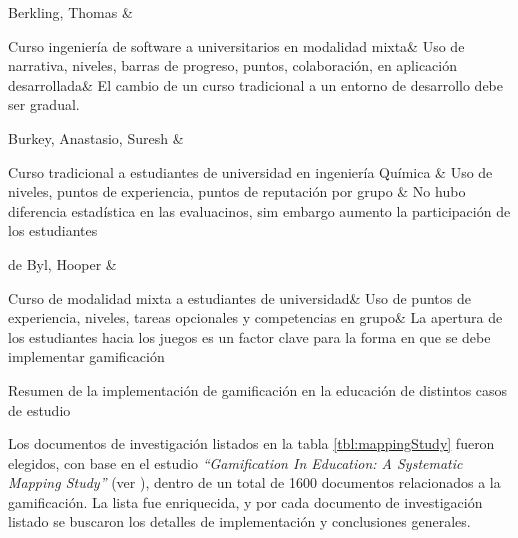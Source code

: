 {        Berkling, Thomas \cite{gamificationFailure} &

            Curso ingeniería de software a universitarios en modalidad mixta&
            Uso de narrativa, niveles, barras de progreso, puntos, colaboración, en aplicación desarrollada&
            El cambio de un curso tradicional a un entorno de desarrollo debe ser gradual.\\\hline


        Burkey, Anastasio, Suresh \cite{gamificationChemical} &

            Curso tradicional a estudiantes de universidad en ingeniería Química &
            Uso de niveles, puntos de experiencia, puntos de reputación por grupo &
            No hubo diferencia estadística en las evaluacinos, sim embargo aumento la participación de los estudiantes\\\hline


        de Byl, Hooper \cite{gamifiedLearningKeyAttributes} &   %

            Curso de modalidad mixta a estudiantes de universidad&
            Uso de puntos de experiencia, niveles, tareas opcionales y competencias en grupo&
            La apertura de los estudiantes hacia los juegos es un factor clave para la forma en que se debe implementar gamificación\\\hline



    }{Resumen de la implementación de gamificación en la educación de distintos casos de estudio}

 \noindent Los documentos de investigación listados en la tabla \ref{tbl:mappingStudy} fueron elegidos, con base en el estudio {\em ``Gamification In Education: A Systematic Mapping Study''} (ver \cite{mappingStudy}), dentro de un total de 1600 documentos relacionados a la gamificación. La lista fue enriquecida, y por cada documento de investigación listado se buscaron los detalles de implementación y conclusiones generales.

